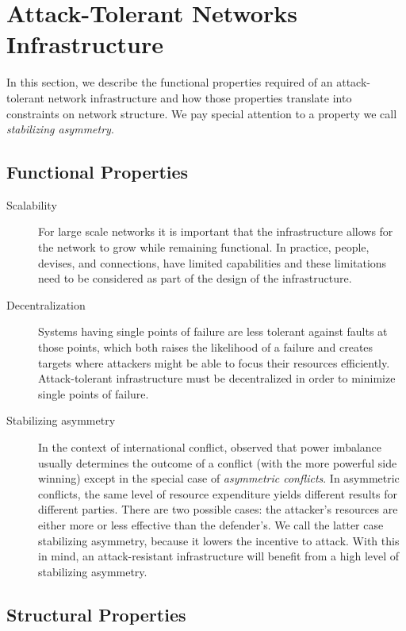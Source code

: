 \documentclass{sig-alternate-05-2015}
\begin{document}
\section{Attack-Tolerant Networks Infrastructure}

In this section, we describe the functional properties required of an
attack-tolerant network infrastructure and how those properties translate
into constraints on network structure.
We pay special attention to a property we call
{\em stabilizing asymmetry}.

\subsection{Functional Properties}

\begin{description}
\item[Scalability]
For large scale networks it is important that the infrastructure allows for the network to grow while remaining functional. In practice, people, devises, and connections, have limited capabilities and these limitations need to be considered as part of the design of the infrastructure. 

\item [Decentralization]
Systems having single points of failure are less tolerant against faults at those
points, which both raises the likelihood of a failure and creates targets
where attackers might be able to focus their resources efficiently.
Attack-tolerant infrastructure must be decentralized in order to minimize single points of failure.

\item[Stabilizing asymmetry]
In the context of international conflict,
\cite{mack_why_1975}
observed that power imbalance usually determines the outcome of a conflict
(with the more powerful side winning)
except in the special case of {\em asymmetric conflicts}.
In asymmetric conflicts, the same level of resource expenditure yields different
results for different parties.
There are two possible cases:
the attacker's resources are either more or less effective than the defender's.
We call the latter case stabilizing asymmetry,
because it lowers the incentive to attack.
With this in mind, an attack-resistant infrastructure will benefit from a high
level of stabilizing asymmetry.

\end{description}
\subsection{Structural Properties}
\end{document}
